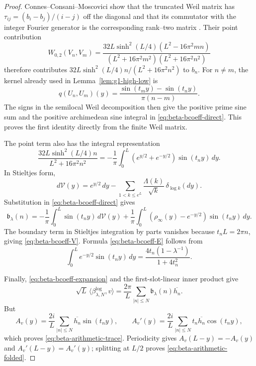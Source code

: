 \documentclass[11pt]{article}
\theoremstyle{remark}
\begin{document}
\begin{proof}
Connes--Consani--Moscovici show that the truncated Weil matrix has
$\tau_{ij}=(b_i-b_j)/(i-j)$ off the diagonal and that its commutator with the
integer Fourier generator is the corresponding rank--two matrix
\cite{ConnesConsaniMoscovici2025}.  Their point contribution
\[
 W_{0,2}(V_n,V_m)
 =\frac{32L\sinh^2(L/4)(L^2-16\pi^2mn)}
 {(L^2+16\pi^2m^2)(L^2+16\pi^2n^2)}
\]
therefore contributes
$32L\sinh^2(L/4)n/(L^2+16\pi^2n^2)$ to $b_n$.
For $n\ne m$, the kernel already used in Lemma~\ref{lem:g1-high-low} is
\[
 q(U_n,U_m)(y)
 =\frac{\sin(t_my)-\sin(t_ny)}{\pi(n-m)}.
\]
The signs in the semilocal Weil decomposition then give the positive prime
sine sum and the positive archimedean sine integral in
\eqref{eq:beta-bcoeff-direct}.  This proves the first identity directly from
the finite Weil matrix.

The point term also has the integral representation
\[
 \frac{32L\sinh^2(L/4)n}{L^2+16\pi^2n^2}
 =-\frac1\pi\int_0^L
   (e^{y/2}+e^{-y/2})\sin(t_ny)\,dy.
\]
In Stieltjes form,
\[
 d\mathcal V(y)=e^{y/2}\,dy
 -\sum_{1<k\le e^L}\frac{\Lambda(k)}{\sqrt k}\,\delta_{\log k}(dy).
\]
Substitution in \eqref{eq:beta-bcoeff-direct} gives
\[
 \mathfrak b_\lambda(n)
 =-\frac1\pi\int_0^L\sin(t_ny)\,d\mathcal V(y)
 +\frac1\pi\int_0^L
   (\rho_\infty(y)-e^{-y/2})\sin(t_ny)\,dy.
\]
The boundary term in Stieltjes integration by parts vanishes because
$t_nL=2\pi n$, giving \eqref{eq:beta-bcoeff-V}.  Formula
\eqref{eq:beta-bcoeff-E} follows from
\[
 \int_0^Le^{-y/2}\sin(t_ny)\,dy
 =\frac{4t_n(1-\lambda^{-1})}{1+4t_n^2}.
\]

Finally, \eqref{eq:beta-bcoeff-expansion} and the first-slot-linear inner
product give
\[
 \sqrt L\,\langle\beta^{\log}_{\lambda,N},v\rangle
 =\frac{2\pi}{L}\sum_{|n|\le N}
   \mathfrak b_\lambda(n)\overline{h_n}.
\]
But
\[
 A_v(y)=\frac{2i}{L}\sum_{|n|\le N}
 \overline{h_n}\sin(t_ny),
 \qquad
 A_v'(y)=\frac{2i}{L}\sum_{|n|\le N}
 t_n\overline{h_n}\cos(t_ny),
\]
which proves \eqref{eq:beta-arithmetic-trace}.  Periodicity gives
$A_v(L-y)=-A_v(y)$ and $A_v'(L-y)=A_v'(y)$; splitting at $L/2$ proves
\eqref{eq:beta-arithmetic-folded}.
\end{proof}
\end{document}
